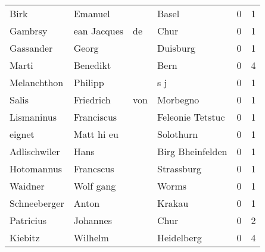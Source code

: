 \begin{center}
\begin{tiny}
\begin{longtabu}{llllrr}
                     Birk &                            Emanuel &             &                                       Basel &          0 &         1 \\
                  Gambrsy &                        ean Jacques &          de &                                        Chur &          0 &         1 \\
                Gassander &                              Georg &             &                                    Duisburg &          0 &         1 \\
                    Marti &                           Benedikt &             &                                        Bern &          0 &         4 \\
              Melanchthon &                            Philipp &             &                                         s j &          0 &         1 \\
                    Salis &                          Friedrich &         von &                                    Morbegno &          0 &         1 \\
               Lismaninus &                         Franciscus &             &                            Feleonie Tetstuc &          0 &         1 \\
                   eignet &                         Matt hi eu &             &                                   Solothurn &          0 &         1 \\
             Adlischwiler &                               Hans &             &                            Birg Bheinfelden &          0 &         1 \\
               Hotomannus &                          Francscus &             &                                  Strassburg &          0 &         1 \\
                  Waidner &                          Wolf gang &             &                                       Worms &          0 &         1 \\
             Schneeberger &                              Anton &             &                                      Krakau &          0 &         1 \\
                Patricius &                           Johannes &             &                                        Chur &          0 &         2 \\
                  Kiebitz &                            Wilhelm &             &                                  Heidelberg &          0 &         4 \\

\end{longtabu}
\end{tiny}
\end{center}
